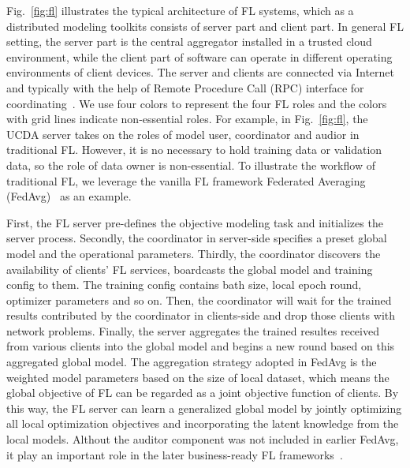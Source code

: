 Fig.~\ref{fig:fl} illustrates the typical architecture of FL systems, which as a distributed modeling toolkits consists of server part and client part. In general FL setting, the server part is the central aggregator installed in a trusted cloud environment, while the client part of software can operate in different operating environments of client devices. 
The server and clients are connected via Internet and typically with the help of Remote Procedure Call (RPC) interface for coordinating~\cite{zhang2022felicitas, abadi2016tensorflow, liu2021fate, beutel2020flower, he2020fedml}.
We use four colors to represent the four FL roles and the colors with grid lines indicate non-essential roles.
For example, in Fig.~\ref{fig:fl}, the UCDA server takes on the roles of model user, coordinator and audior in traditional FL. 
However, it is no necessary to hold training data or validation data, so the role of data owner is non-essential.
To illustrate the workflow of traditional FL, we leverage the vanilla FL framework Federated Averaging (FedAvg)~\cite{mcmahan2017communication, bonawitz2019towards} as an example.

First, the FL server pre-defines the objective modeling task and initializes the server process.
Secondly,  the coordinator in server-side specifies a preset global model and the operational parameters.
Thirdly, the coordinator discovers the availability of clients' FL services, boardcasts the global model and training config to them. The training config contains bath size, local epoch round, optimizer parameters and so on. Then, the coordinator will wait for the trained results contributed by the coordinator in clients-side and drop those clients with network problems.
Finally, the server aggregates the trained resultes received from various clients into the global model and begins a new round based on this aggregated global model. 
The aggregation strategy adopted in FedAvg is the weighted model parameters based on the size of local dataset, which means the global objective of FL can be regarded as a joint objective function of clients. 
By this way, the FL server can learn a generalized global model by jointly optimizing all local optimization objectives and incorporating the latent knowledge from the local models.
Althout the auditor component was not included in earlier FedAvg, it play an important role in the later business-ready FL frameworks~\cite{liu2021fate,roth2022nvidia, ziller2021pysyft}.

